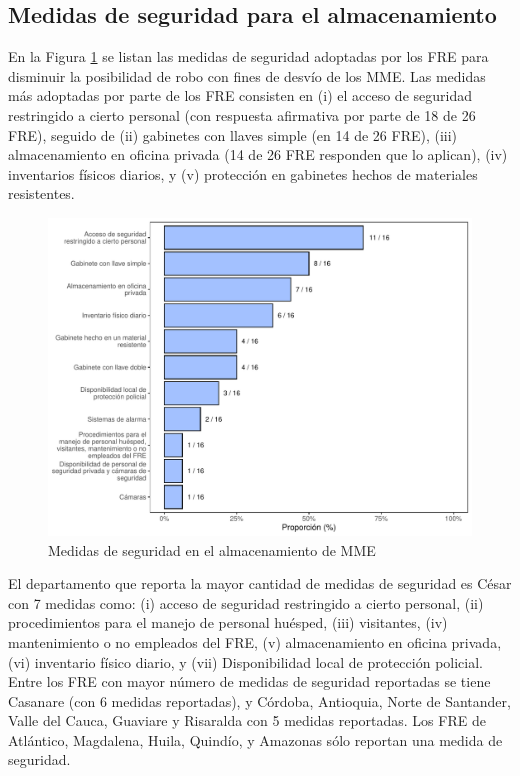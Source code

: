 \documentclass[
]{book}
\begin{document}
\hypertarget{medidas-de-seguridad-para-el-almacenamiento}{%
\subsection{Medidas de seguridad para el almacenamiento}\label{medidas-de-seguridad-para-el-almacenamiento}}

En la Figura \ref{fig:MedidasSeguridadAlmacenamientoMME} se listan las medidas de seguridad adoptadas por los FRE para disminuir la posibilidad de robo con fines de desvío de los MME. Las medidas más adoptadas por parte de los FRE consisten en (i) el acceso de seguridad restringido a cierto personal (con respuesta afirmativa por parte de 18 de 26 FRE), seguido de (ii) gabinetes con llaves simple (en 14 de 26 FRE), (iii) almacenamiento en oficina privada (14 de 26 FRE responden que lo aplican), (iv) inventarios físicos diarios, y (v) protección en gabinetes hechos de materiales resistentes.

\begin{figure}
\includegraphics[width=0.9\linewidth]{InformeFinal_files/figure-latex/MedidasSeguridadAlmacenamientoMME-1} \caption{Medidas de seguridad en el almacenamiento de MME}\label{fig:MedidasSeguridadAlmacenamientoMME}
\end{figure}

El departamento que reporta la mayor cantidad de medidas de seguridad es César con 7 medidas como: (i) acceso de seguridad restringido a cierto personal, (ii) procedimientos para el manejo de personal huésped, (iii) visitantes, (iv) mantenimiento o no empleados del FRE, (v) almacenamiento en oficina privada, (vi) inventario físico diario, y (vii) Disponibilidad local de protección policial. Entre los FRE con mayor número de medidas de seguridad reportadas se tiene Casanare (con 6 medidas reportadas), y Córdoba, Antioquia, Norte de Santander, Valle del Cauca, Guaviare y Risaralda con 5 medidas reportadas. Los FRE de Atlántico, Magdalena, Huila, Quindío, y Amazonas sólo reportan una medida de seguridad.
\end{document}
